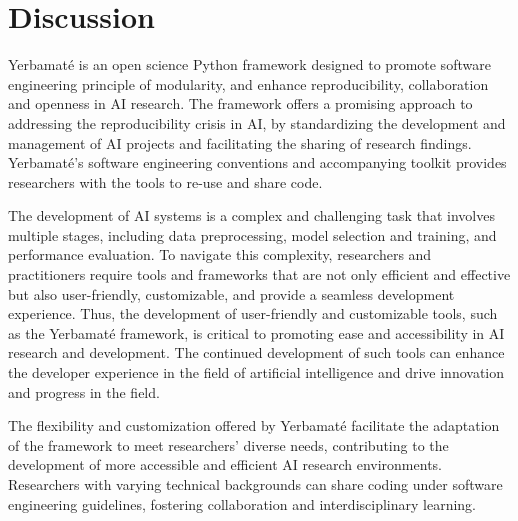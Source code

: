 \section{Discussion}

Yerbamaté is an open science Python framework designed to promote software engineering principle of modularity, and enhance reproducibility, collaboration and openness in AI research. The framework offers a promising approach to addressing the reproducibility crisis in AI, by standardizing the development and management of AI projects and facilitating the sharing of research findings. Yerbamaté's software engineering conventions and accompanying toolkit provides researchers with the tools to re-use and share code.

The development of AI systems is a complex and challenging task that involves multiple stages, including data preprocessing, model selection and training, and performance evaluation. To navigate this complexity, researchers and practitioners require tools and frameworks that are not only efficient and effective but also user-friendly, customizable, and provide a seamless development experience. Thus, the development of user-friendly and customizable tools, such as the Yerbamaté framework, is critical to promoting ease and accessibility in AI research and development. The continued development of such tools can enhance the developer experience in the field of artificial intelligence and drive innovation and progress in the field.


The flexibility and customization offered by Yerbamaté facilitate the adaptation of the framework to meet researchers' diverse needs, contributing to the development of more accessible and efficient AI research environments. Researchers with varying technical backgrounds can share coding under software engineering guidelines, fostering collaboration and interdisciplinary learning.


